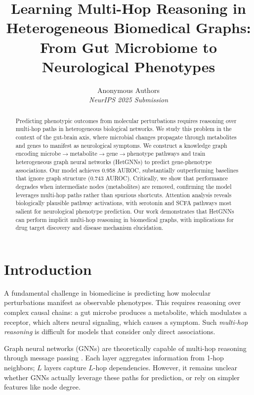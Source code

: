 \documentclass{article}
\title{Learning Multi-Hop Reasoning in Heterogeneous Biomedical Graphs:\\From Gut Microbiome to Neurological Phenotypes}
\author{
    Anonymous Authors\\
    \textit{NeurIPS 2025 Submission}
}
\date{}
\begin{document}
\maketitle

\begin{abstract}
Predicting phenotypic outcomes from molecular perturbations requires reasoning over multi-hop paths in heterogeneous biological networks. We study this problem in the context of the gut-brain axis, where microbial changes propagate through metabolites and genes to manifest as neurological symptoms. We construct a knowledge graph encoding microbe$\rightarrow$metabolite$\rightarrow$gene$\rightarrow$phenotype pathways and train heterogeneous graph neural networks (HetGNNs) to predict gene-phenotype associations. Our model achieves 0.958 AUROC, substantially outperforming baselines that ignore graph structure (0.743 AUROC). Critically, we show that performance degrades when intermediate nodes (metabolites) are removed, confirming the model leverages multi-hop paths rather than spurious shortcuts. Attention analysis reveals biologically plausible pathway activations, with serotonin and SCFA pathways most salient for neurological phenotype prediction. Our work demonstrates that HetGNNs can perform implicit multi-hop reasoning in biomedical graphs, with implications for drug target discovery and disease mechanism elucidation.
\end{abstract}

\section{Introduction}

A fundamental challenge in biomedicine is predicting how molecular perturbations manifest as observable phenotypes. This requires reasoning over complex causal chains: a gut microbe produces a metabolite, which modulates a receptor, which alters neural signaling, which causes a symptom. Such \textit{multi-hop reasoning} is difficult for models that consider only direct associations.

Graph neural networks (GNNs) are theoretically capable of multi-hop reasoning through message passing \citep{xu2019powerful}. Each layer aggregates information from 1-hop neighbors; $L$ layers capture $L$-hop dependencies. However, it remains unclear whether GNNs actually leverage these paths for prediction, or rely on simpler features like node degree.
\end{document}

